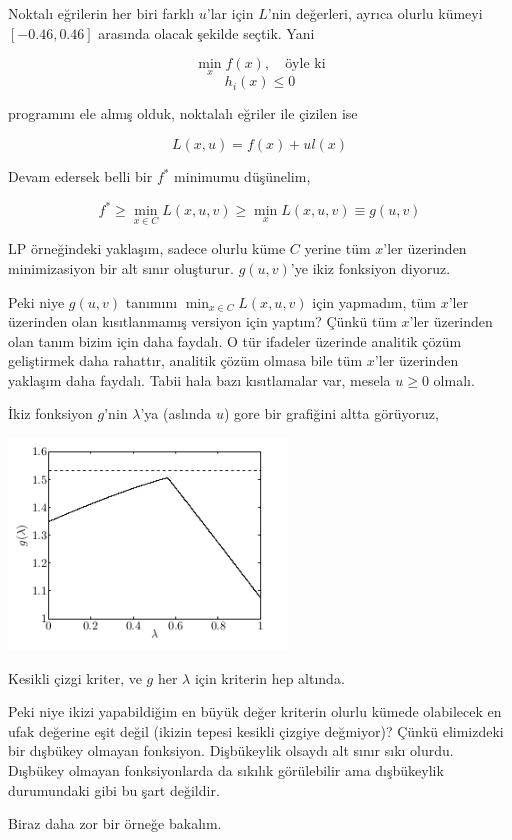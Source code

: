 \documentclass[12pt,fleqn]{article}\usepackage{../../common}
\begin{document}
Noktalı eğrilerin her biri farklı $u$'lar için $L$'nin değerleri, ayrıca
olurlu kümeyi $[-0.46,0.46]$ arasında olacak şekilde seçtik. Yani 

$$
\min_{x} f(x), \quad \textrm{öyle ki}
$$
$$
h_i(x) \le 0
$$

programını ele almış olduk, noktalalı eğriler ile çizilen ise 

$$
L(x,u) = f(x) + u l(x)
$$

Devam edersek belli bir $f^\ast$ minimumu düşünelim, 

$$
f^\ast \ge \min_{x \in C} L(x,u,v) \ge \min_x L(x,u,v) \equiv g(u,v)
$$ 

LP örneğindeki yaklaşım, sadece olurlu küme $C$ yerine tüm $x$'ler
üzerinden minimizasiyon bir alt sınır oluşturur. $g(u,v)$'ye ikiz fonksiyon
diyoruz.

Peki niye $g(u,v)$ tanımını $\min_{x \in C} L(x,u,v)$ için yapmadım, tüm
$x$'ler üzerinden olan kısıtlanmamış versiyon için yaptım? Çünkü tüm
$x$'ler üzerinden olan tanım bizim için daha faydalı. O tür ifadeler
üzerinde analitik çözüm geliştirmek daha rahattır, analitik çözüm olmasa
bile tüm $x$'ler üzerinden yaklaşım daha faydalı. Tabii hala bazı
kısıtlamalar var, mesela $u \ge 0$ olmalı.

İkiz fonksiyon $g$'nin $\lambda$'ya (aslında $u$) gore bir grafiğini altta görüyoruz,

\includegraphics[width=20em]{func_56_gendual_02.png}

Kesikli çizgi kriter, ve $g$ her $\lambda$ için kriterin hep altında.

Peki niye ikizi yapabildiğim en büyük değer kriterin olurlu kümede
olabilecek en ufak değerine eşit değil (ikizin tepesi kesikli çizgiye
değmiyor)? Çünkü elimizdeki bir dışbükey olmayan fonksiyon. Dişbükeylik
olsaydı alt sınır sıkı olurdu. Dışbükey olmayan fonksiyonlarda da sıkılık
görülebilir ama dışbükeylik durumundaki gibi bu şart değildir.

Biraz daha zor bir örneğe bakalım. 
\end{document}
